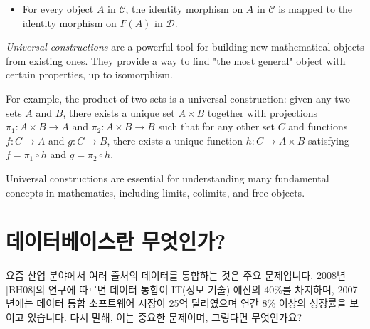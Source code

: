 \documentclass[11pt, a4paper, twoside, openany]{book}
\begin{document}
{\begin{itemize}
\par\medskip
$$
\begin{tikzpicture}
\node[draw,circle] (A) at (0,0) {A};
\node[draw,circle] (B) at (2,0) {B};
\node[draw,circle] (C) at (4,0) {C};
\draw[->] (A) -- node[midway,above] {$\alpha$} (B);
\draw[->] (B) -- node[midway,above] {$\beta$} (C);
\draw[->] (A) -- node[midway,above] {$\gamma$} (C);
\end{tikzpicture}
$$

\par\medskip
That is, $F_{\text{Hom}}(A, C) \circ F_{\text{Hom}}(B, A) = F_{\text{Hom}}(B, C)$.

\par\medskip
\item For every object $A$ in $\mathcal{C}$, the identity morphism on $A$ in $\mathcal{C}$ is mapped to the identity morphism on $F(A)$ in $\mathcal{D}$.

\par\medskip
\end{itemize}

\par\medskip
\textit{Universal constructions} are a powerful tool for building new mathematical objects from existing ones. They provide a way to find "the most general" object with certain properties, up to isomorphism. 

\par\medskip
For example, the product of two sets is a universal construction: given any two sets $A$ and $B$, there exists a unique set $A \times B$ together with projections $\pi_1: A \times B \rightarrow A$ and $\pi_2: A \times B \rightarrow B$ such that for any other set $C$ and functions $f: C \rightarrow A$ and $g: C \rightarrow B$, there exists a unique function $h: C \rightarrow A \times B$ satisfying $f = \pi_1 \circ h$ and $g = \pi_2 \circ h$.

\par\medskip
Universal constructions are essential for understanding many fundamental concepts in mathematics, including limits, colimits, and free objects.


\section{데이터베이스란 무엇인가?}
\label{sec:3-1}

요즘 산업 분야에서 여러 출처의 데이터를 통합하는 것은 주요 문제입니다. 2008\hspace{0pt}년 [BH08]의 연구에 따르면 데이터 통합이 IT(정보 기술) 예산의 40\%를 차지하며, 2007\hspace{0pt}년에는 데이터 통합 소프트웨어 시장이 25\hspace{0pt}억 달러였으며 연간 8\% 이상의 성장률을 보이고 있습니다. 다시 말해, 이는 중요한 문제이며, 그렇다면 무엇인가요?

}
\end{document}

